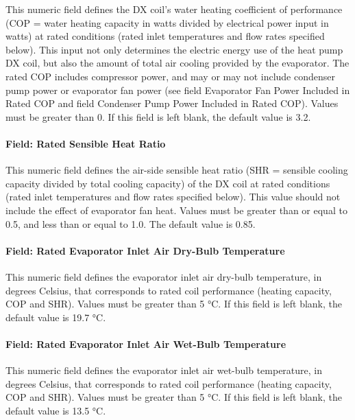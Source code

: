 This numeric field defines the DX coil's water heating coefficient of performance (COP = water heating capacity in watts divided by electrical power input in watts) at rated conditions (rated inlet temperatures and flow rates specified below). This input not only determines the electric energy use of the heat pump DX coil, but also the amount of total air cooling provided by the evaporator. The rated COP includes compressor power, and may or may not include condenser pump power or evaporator fan power (see field Evaporator Fan Power Included in Rated COP and field Condenser Pump Power Included in Rated COP). Values must be greater than 0. If this field is left blank, the default value is 3.2.

\paragraph{Field: Rated Sensible Heat Ratio}\label{field-rated-sensible-heat-ratio-1}

This numeric field defines the air-side sensible heat ratio (SHR = sensible cooling capacity divided by total cooling capacity) of the DX coil at rated conditions (rated inlet temperatures and flow rates specified below). This value should not include the effect of evaporator fan heat. Values must be greater than or equal to 0.5, and less than or equal to 1.0. The default value is 0.85.

\paragraph{Field: Rated Evaporator Inlet Air Dry-Bulb Temperature}\label{field-rated-evaporator-inlet-air-dry-bulb-temperature}

This numeric field defines the evaporator inlet air dry-bulb temperature, in degrees Celsius, that corresponds to rated coil performance (heating capacity, COP and SHR). Values must be greater than 5 °C. If this field is left blank, the default value is 19.7 °C.

\paragraph{Field: Rated Evaporator Inlet Air Wet-Bulb Temperature}\label{field-rated-evaporator-inlet-air-wet-bulb-temperature}

This numeric field defines the evaporator inlet air wet-bulb temperature, in degrees Celsius, that corresponds to rated coil performance (heating capacity, COP and SHR). Values must be greater than 5 °C. If this field is left blank, the default value is 13.5 °C.

